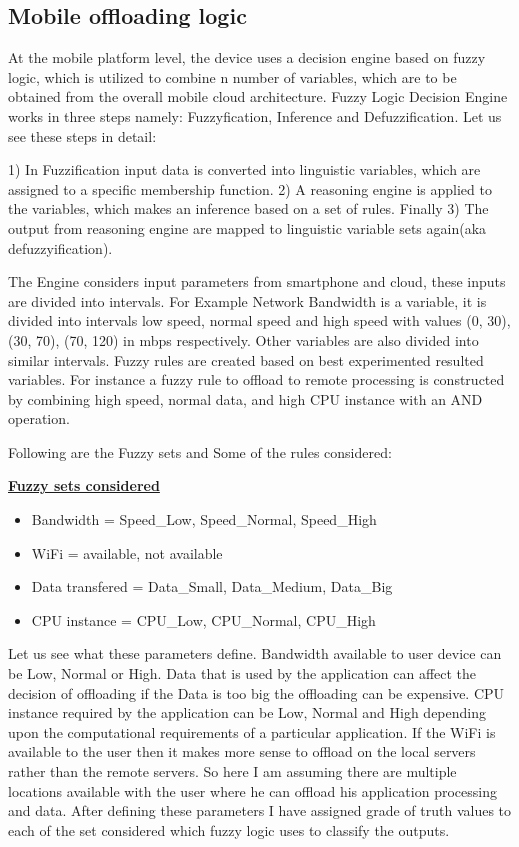 \documentclass[12pt]{report}
\begin{document}
\subsection{Mobile offloading logic}

At the mobile platform level, the device uses a decision engine based on fuzzy logic, which is utilized to combine n number of variables, which are to be obtained from the overall mobile cloud architecture. Fuzzy Logic Decision Engine works in three steps namely: Fuzzyfication, Inference and Defuzzification. Let us see these steps in detail:

1) In Fuzzification input data is converted into linguistic variables, which are assigned to a specific membership function. 2) A reasoning engine is applied to the variables, which makes an inference based on a set of rules. Finally 3) The output from reasoning engine are mapped to linguistic variable sets again(aka defuzzyification).

The Engine considers input parameters from smartphone and cloud, these inputs are divided into intervals.
For Example Network Bandwidth is a variable, it is divided into intervals low speed, normal speed and high speed with values (0, 30), (30, 70), (70, 120) in mbps respectively. Other variables are also divided into similar intervals. Fuzzy rules are created based on best experimented resulted variables. For instance a fuzzy rule to offload to remote processing is constructed by combining high speed, normal data, and high CPU instance with an AND operation.
   
Following are the Fuzzy sets and Some of the rules considered:
\begin{center}
\textbf{\underline{Fuzzy sets considered}}

\begin{itemize}

\item Bandwidth = Speed\_Low, Speed\_Normal, Speed\_High
\item WiFi = available, not available 
\item Data transfered = Data\_Small, Data\_Medium, Data\_Big 
\item CPU instance = CPU\_Low, CPU\_Normal, CPU\_High 

\end{itemize}
\end{center}
Let us see what these parameters define. Bandwidth available to user device can be Low, Normal or High. Data that is used by the application can affect the decision of offloading if the Data is too big the offloading can be expensive. CPU instance required by the application can be Low, Normal and High depending upon the computational requirements of a particular application.
If the WiFi is available to the user then it makes more sense to offload on the local servers rather than the remote servers. So here I am assuming there are multiple locations available with the user where he can offload his application processing and data. After defining these parameters I have assigned grade of truth values to each of the set considered which fuzzy logic uses to classify the outputs.\par
\end{document}
